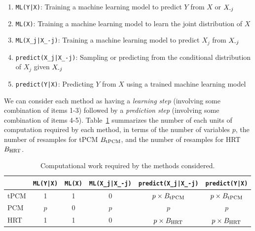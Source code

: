 \documentclass[12pt]{article}
\theoremstyle{definition}
\theoremstyle{remark}
\newcommand{\srx}{X}									%
\newcommand{\sry}{Y}									%
\newcommand{\minus}{\textnormal{-}} 						    %
\begin{document}
\begin{enumerate}
	\item \texttt{ML(Y|X)}: Training a machine learning model to predict $\sry$ from $\srx$ or $\srx_{\minus j}$
	\item \texttt{ML(X)}: Training a machine learning model to learn the joint distribution of $X$
	\item \verb!ML(X_j|X_-j)!: Training a machine learning model to predict $X_j$ from $X_{\minus j}$
	\item \verb!predict(X_j|X_-j)!: Sampling or predicting from the conditional distribution of $X_j$ given $X_{\minus j}$
	\item \verb!predict(Y|X)!: Predicting $Y$ from $X$ using a trained machine learning model
\end{enumerate}
We can consider each method as having a \textit{learning step} (involving some combination of items 1-3) followed by a \textit{prediction step} (involving some combination of items 4-5). Table~\ref{tab: computational work} summarizes the number of each units of computation required by each method, in terms of the number of variables $p$, the number of resamples for tPCM $B_{\textnormal{tPCM}}$, and the number of resamples for HRT $B_{\textnormal{HRT}}$.

\begin{table}[h!]
	\centering
	\begin{tabular}{|l||c|c|c||c|c|}
		\hline
		& \texttt{ML(Y|X)} & \texttt{ML(X)} & \verb!ML(X_j|X_-j)! & \verb!predict(X_j|X_-j)! & \verb!predict(Y|X)! \\
		\hline
		tPCM & 1 & 1 & 0 & $p \times B_{\textnormal{tPCM}}$ & $p \times B_{\textnormal{tPCM}}$ \\
		PCM & $p$ & 0 & $p$ & $p$ & $p$ \\
		HRT & 1 & 1 & 0 & $p \times B_{\textnormal{HRT}}$ & $p \times B_{\textnormal{HRT}}$ \\
		\hline
	\end{tabular}
	\caption{Computational work required by the methods considered.}
	\label{tab: computational work}
\end{table}
\end{document}
